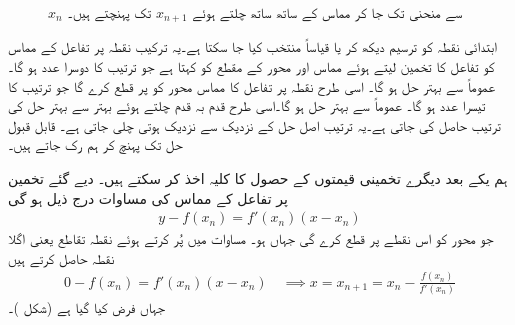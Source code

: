 \begin{figure}
\begin{minipage}{0.40\textwidth}
\caption
{$x_n$ سے منحنی تک جا کر مماس کے ساتھ ساتھ چلتے ہوئے $x_{n+1}$ تک پہنچتے ہیں۔}
\label{شکل_استعمال_نیوٹن_ترکیب_الف}
\end{minipage}
\end{figure}

ابتدائی نقطہ  کو ترسیم دیکھ کر یا قیاساً منتخب کیا جا سکتا ہے۔یہ ترکیب نقطہ  پر تفاعل کے مماس کو تفاعل کا تخمین لیتے ہوئے مماس اور محور  کے مقطع کو  کہتا ہے جو ترتیب کا دوسرا عدد ہو گا۔ عموماً  سے بہتر حل ہو گا۔ اسی طرح  نقطہ  پر تفاعل کا مماس محور   کو   پر قطع کرے گا جو ترتیب کا تیسرا عدد ہو گا۔ عموماً  سے بہتر حل ہو گا۔اسی طرح قدم بہ قدم چلتے ہوئے بہتر سے بہتر حل کی ترتیب حاصل کی جاتی ہے۔یہ ترتیب اصل حل کے نزدیک سے نزدیک ہوتی چلی جاتی ہے۔ قابل قبول حل تک پہنچ کر ہم رک جاتے ہیں۔ 

ہم یکے بعد دیگرے تخمینی قیمتوں کے حصول کا کلیہ اخذ کر سکتے ہیں۔ دیے گئے تخمین  پر تفاعل کے مماس کی مساوات درج ذیل ہو گی
\begin{align}\label{مساوات_استعمال_نیوٹن_الف}
y-f(x_n)=f'(x_n)(x-x_n)
\end{align} 
جو  محور  کو اس نقطے پر قطع کرے گی  جہاں  ہو۔ مساوات  میں  پُر کرتے ہوئے نقطہ تقاطع  یعنی اگلا نقطہ  حاصل کرتے ہیں
\begin{align*}
0-f(x_n)=f'(x_n)(x-x_n)\quad \implies x=x_{n+1}=x_n-\frac{f(x_n)}{f'(x_n)}
\end{align*}
 جہاں  فرض کیا گیا ہے  (شکل )۔

